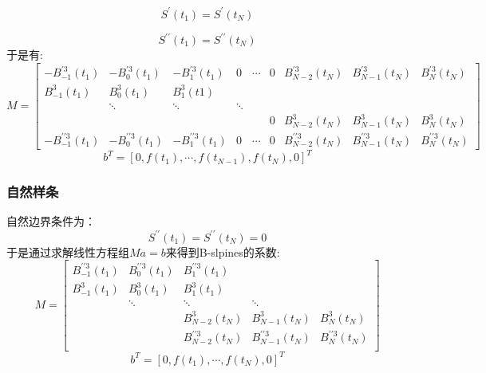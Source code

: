 \documentclass[a4paper]{article}
\begin{document}
\begin{equation}
    S^\prime(t_1) = S^\prime(t_N)
\end{equation}

\begin{equation}
    S^{\prime \prime}(t_1) = S^{\prime \prime}(t_N)
\end{equation}
于是有:
\begin{equation}
    M = \begin{bmatrix}
        -B_{-1}^{\prime3}(t_1)&-B_{0}^{\prime3}(t_1)&-B_{1}^{\prime3}(t_1) &0&\cdots&0&B_{N-2}^{\prime3}(t_N)&B_{N-1}^{\prime3}(t_N)&B_{N}^{\prime3}(t_N) \\
        B_{-1}^3(t_1)&B_{0}^3(t_1) &B_{1}^3(t1) \\
        & \ddots & \ddots & \ddots \\
        &&&&&0 & B_{N-2}^3(t_N)&B_{N-1}^3(t_N)&B_{N}^3(t_N)\\
        -B_{-1}^{\prime\prime3}(t_1)&-B_{0}^{\prime\prime3}(t_1)&-B_{1}^{\prime\prime3}(t_1) &0&\cdots&0&B_{N-2}^{\prime\prime3}(t_N)&B_{N-1}^{\prime\prime3}(t_N)&B_{N}^{\prime\prime3}(t_N)
    \end{bmatrix}
\end{equation}
\begin{equation}
    b^T = [0,f(t_1),\cdots,f(t_{N-1}),f(t_N),0]^T
\end{equation}

\subsubsection{自然样条}
自然边界条件为：
\begin{equation}
    S^{\prime \prime}(t_1) = S^{\prime\prime}(t_N)=0
\end{equation}
于是通过求解线性方程组$Ma=b$来得到B-slpines的系数:
\begin{equation}
    M=\begin{bmatrix}
        B_{-1}^{\prime \prime 3}(t_1)& B_{0}^{\prime \prime 3}(t_1) &B_{1}^{\prime \prime 3}(t_1)\\
        B_{-1}^3(t_1) &B_{0}^3(t_1)&B_{1}^3(t_1)\\
        &\ddots &\ddots&\ddots&\\
        &&B_{N-2}^3(t_N)&B_{N-1}^3(t_N)&B_{N}^3(t_N)\\
        &&B_{N-2}^{\prime \prime 3}(t_N)&B_{N-1}^{\prime \prime 3}(t_N)&B_{N}^{\prime \prime 3}(t_N)\\
    \end{bmatrix}
\end{equation}
\begin{equation}
    b^T = [0,f(t_1),\cdots,f(t_N),0]^T
\end{equation}
\end{document}
